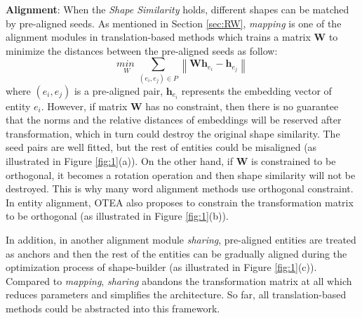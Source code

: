 \documentclass[sigconf,camera-ready]{acmart}
\begin{document}
\textbf{Alignment}:
When the \emph{Shape Similarity} holds, different shapes can be matched by pre-aligned seeds.
As mentioned in Section \ref{sec:RW}, \emph{mapping} is one of the alignment modules in translation-based methods which trains a matrix $\bm{W}$ to minimize the distances between the pre-aligned seeds \cite{DBLP:conf/ijcai/ChenTYZ17} as follow:
\begin{equation}
  \underset W{min\;}\sum_{(e_i,e_j)\in P}\left\|\bm{W}\bm{h}_{e_i}-\bm{h}_{e_j}\right\|
\end{equation}
where $(e_i,e_j)$ is a pre-aligned pair, $\bm{h}_{e_i}$ represents the embedding vector of entity $e_i$.
However, if matrix $\bm{W}$ has no constraint, then there is no guarantee that the norms and the relative distances of embeddings will be reserved after transformation, which in turn could destroy the original shape similarity.
The seed pairs are well fitted, but the rest of entities could be misaligned (as illustrated in Figure \ref{fig:1}(a)).
On the other hand, if $\bm{W}$ is constrained to be orthogonal, it becomes a rotation operation and then shape similarity will not be destroyed.
This is why many word alignment methods\cite{DBLP:conf/naacl/XingWLL15,DBLP:conf/iclr/SmithTHH17} use orthogonal constraint.
In entity alignment, OTEA \cite{DBLP:conf/ijcai/Pei0Z19} also proposes to constrain the transformation matrix to be orthogonal (as illustrated in Figure \ref{fig:1}(b)).

In addition, in another alignment module \emph{sharing}, pre-aligned entities are treated as anchors and then the rest of the entities can be gradually aligned during the optimization process of shape-builder (as illustrated in Figure \ref{fig:1}(c)).
Compared to \emph{mapping}, \emph{sharing} abandons the transformation matrix at all which reduces parameters and simplifies the architecture.
So far, all translation-based methods could be abstracted into this framework.
\end{document}
